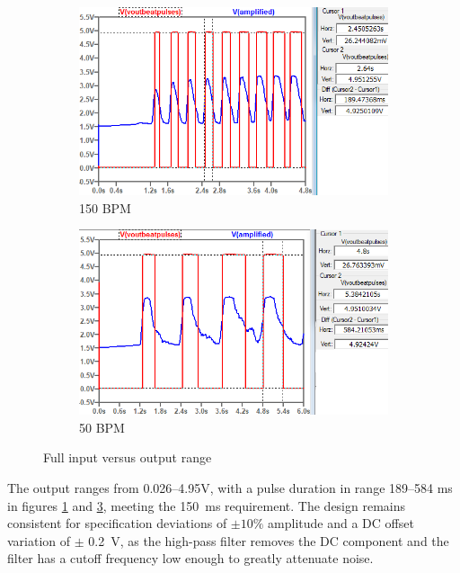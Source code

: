 \begin{figure}[h]
 \footnotesize
   \centering
   \begin{subfigure}[]{0.49\textwidth} 	 
  	 \includegraphics[width=\linewidth]{./Figures/pulses2}
	  \caption{150 BPM} 
	  \label{subfig:pulses2}	
   \end{subfigure}
   \begin{subfigure}[]{0.49\textwidth}
        \includegraphics[width=\linewidth]{./Figures/pulses1}
	  \caption{50 BPM} 
	  \label{subfig:pulses1}	
   \end{subfigure}
   \caption{Full input versus output range}
 \end{figure}

\pagebreak 
 
The output ranges from \numrange{0.026}{4.95}\si{V}, with a pulse duration in range \numrange{189}{584} \si{ms} in figures \ref{subfig:pulses2} and \ref{subfig:pulses1}, meeting the \SI{150}{ms} requirement. The design remains consistent for specification deviations of $\pm 10\%$ amplitude and a DC offset variation of $\pm$ \SI{0.2}{V}, as the high-pass filter removes the DC component and the filter has a cutoff frequency low enough to greatly attenuate noise.\\

